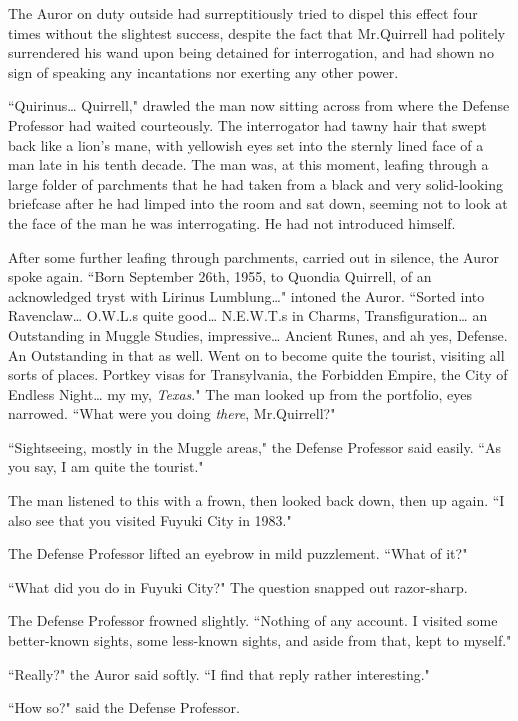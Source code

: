 The Auror on duty outside had surreptitiously tried to dispel this effect four times without the slightest success, despite the fact that Mr.\?Quirrell had politely surrendered his wand upon being detained for interrogation, and had shown no sign of speaking any incantations nor exerting any other power.

``Quirinus{\ldots} Quirrell," drawled the man now sitting across from where the Defense Professor had waited courteously. The interrogator had tawny hair that swept back like a lion's mane, with yellowish eyes set into the sternly lined face of a man late in his tenth decade. The man was, at this moment, leafing through a large folder of parchments that he had taken from a black and very solid-looking briefcase after he had limped into the room and sat down, seeming not to look at the face of the man he was interrogating. He had not introduced himself.

After some further leafing through parchments, carried out in silence, the Auror spoke again. ``Born September 26th, 1955, to Quondia Quirrell, of an acknowledged tryst with Lirinus Lumblung{\ldots}" intoned the Auror. ``Sorted into Ravenclaw{\ldots} O.W.L.s quite good{\ldots} N.E.W.T.s in Charms, Transfiguration{\ldots} an Outstanding in Muggle Studies, impressive{\ldots} Ancient Runes, and ah yes, Defense. An Outstanding in that as well. Went on to become quite the tourist, visiting all sorts of places. Portkey visas for Transylvania, the Forbidden Empire, the City of Endless Night{\ldots} my my, \emph{Texas}." The man looked up from the portfolio, eyes narrowed. ``What were you doing \emph{there}, Mr.\?Quirrell?"

``Sightseeing, mostly in the Muggle areas," the Defense Professor said easily. ``As you say, I am quite the tourist."

The man listened to this with a frown, then looked back down, then up again. ``I also see that you visited Fuyuki City in 1983."

The Defense Professor lifted an eyebrow in mild puzzlement. ``What of it?"

``What did you do in Fuyuki City?" The question snapped out razor-sharp.

The Defense Professor frowned slightly. ``Nothing of any account. I visited some better-known sights, some less-known sights, and aside from that, kept to myself."

``Really?" the Auror said softly. ``I find that reply rather interesting."

``How so?" said the Defense Professor.

